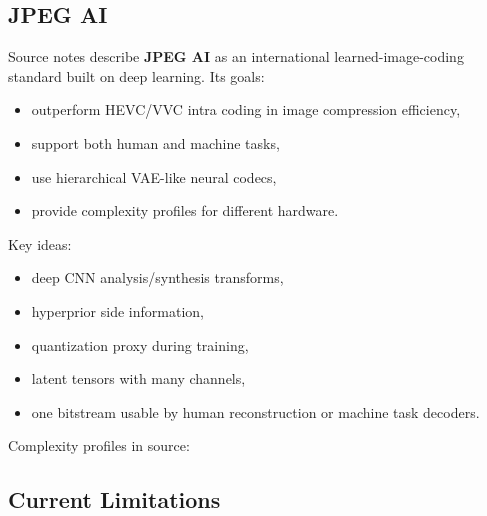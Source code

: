 \subsection{JPEG AI}

Source notes describe \textbf{JPEG AI} as an international learned-image-coding standard built on deep learning. Its goals:

\begin{itemize}
  \item outperform HEVC/VVC intra coding in image compression efficiency,
  \item support both human and machine tasks,
  \item use hierarchical VAE-like neural codecs,
  \item provide complexity profiles for different hardware.
\end{itemize}

Key ideas:

\begin{itemize}
  \item deep CNN analysis/synthesis transforms,
  \item hyperprior side information,
  \item quantization proxy during training,
  \item latent tensors with many channels,
  \item one bitstream usable by human reconstruction or machine task decoders.
\end{itemize}

Complexity profiles in source:

\begin{center}
\end{center}

\subsection{Current Limitations}

